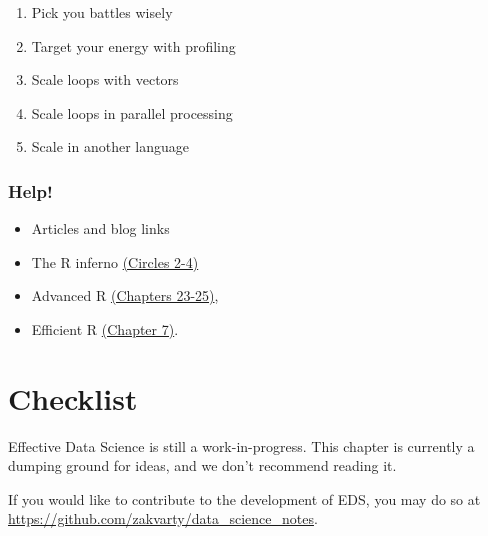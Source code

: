 \documentclass[
  letterpaper,
  DIV=11,
  numbers=noendperiod]{scrreprt}
\providecommand{\tightlist}{%
  \setlength{\itemsep}{0pt}\setlength{\parskip}{0pt}}\usepackage{longtable,booktabs,array}
\begin{document}
\begin{enumerate}
\def\labelenumi{\arabic{enumi}.}
\tightlist
\item
  Pick you battles wisely
\item
  Target your energy with profiling
\item
  Scale loops with vectors
\item
  Scale loops in parallel processing
\item
  Scale in another language
\end{enumerate}

\subsection*{Help!}\label{help}

\begin{itemize}
\tightlist
\item
  Articles and blog links
\item
  The R inferno
  \href{https://www.burns-stat.com/pages/Tutor/R_inferno.pdf}{(Circles
  2-4)}
\item
  Advanced R \href{https://adv-r.hadley.nz/techniques.html}{(Chapters
  23-25)},
\item
  Efficient R
  \href{https://csgillespie.github.io/efficientR/performance.html\#prerequisites-6}{(Chapter
  7)}.
\end{itemize}

\chapter*{Checklist}\label{production-checklist}


\begin{tcolorbox}[enhanced jigsaw, leftrule=.75mm, bottomtitle=1mm, toprule=.15mm, colbacktitle=quarto-callout-important-color!10!white, breakable, colback=white, bottomrule=.15mm, opacityback=0, colframe=quarto-callout-important-color-frame, title=\textcolor{quarto-callout-important-color}{\faExclamation}\hspace{0.5em}{Important}, titlerule=0mm, toptitle=1mm, opacitybacktitle=0.6, arc=.35mm, rightrule=.15mm, coltitle=black, left=2mm]

Effective Data Science is still a work-in-progress. This chapter is
currently a dumping ground for ideas, and we don't recommend reading it.

If you would like to contribute to the development of EDS, you may do so
at \url{https://github.com/zakvarty/data_science_notes}.

\end{tcolorbox}
\end{document}
